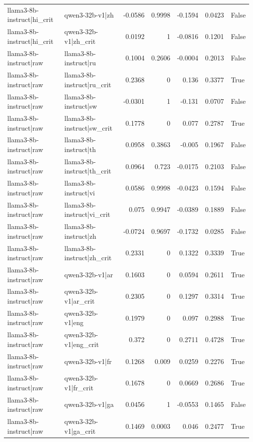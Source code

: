 \begin{table}
\begin{tabular}{l l r r r r l}
llama3-8b-instruct|hi_crit & qwen3-32b-v1|zh & -0.0586 & 0.9998 & -0.1594 & 0.0423 & False \\
llama3-8b-instruct|hi_crit & qwen3-32b-v1|zh_crit & 0.0192 & 1 & -0.0816 & 0.1201 & False \\
llama3-8b-instruct|raw & llama3-8b-instruct|ru & 0.1004 & 0.2606 & -0.0004 & 0.2013 & False \\
llama3-8b-instruct|raw & llama3-8b-instruct|ru_crit & 0.2368 & 0 & 0.136 & 0.3377 & True \\
llama3-8b-instruct|raw & llama3-8b-instruct|sw & -0.0301 & 1 & -0.131 & 0.0707 & False \\
llama3-8b-instruct|raw & llama3-8b-instruct|sw_crit & 0.1778 & 0 & 0.077 & 0.2787 & True \\
llama3-8b-instruct|raw & llama3-8b-instruct|th & 0.0958 & 0.3863 & -0.005 & 0.1967 & False \\
llama3-8b-instruct|raw & llama3-8b-instruct|th_crit & 0.0964 & 0.723 & -0.0175 & 0.2103 & False \\
llama3-8b-instruct|raw & llama3-8b-instruct|vi & 0.0586 & 0.9998 & -0.0423 & 0.1594 & False \\
llama3-8b-instruct|raw & llama3-8b-instruct|vi_crit & 0.075 & 0.9947 & -0.0389 & 0.1889 & False \\
llama3-8b-instruct|raw & llama3-8b-instruct|zh & -0.0724 & 0.9697 & -0.1732 & 0.0285 & False \\
llama3-8b-instruct|raw & llama3-8b-instruct|zh_crit & 0.2331 & 0 & 0.1322 & 0.3339 & True \\
llama3-8b-instruct|raw & qwen3-32b-v1|ar & 0.1603 & 0 & 0.0594 & 0.2611 & True \\
llama3-8b-instruct|raw & qwen3-32b-v1|ar_crit & 0.2305 & 0 & 0.1297 & 0.3314 & True \\
llama3-8b-instruct|raw & qwen3-32b-v1|eng & 0.1979 & 0 & 0.097 & 0.2988 & True \\
llama3-8b-instruct|raw & qwen3-32b-v1|eng_crit & 0.372 & 0 & 0.2711 & 0.4728 & True \\
llama3-8b-instruct|raw & qwen3-32b-v1|fr & 0.1268 & 0.009 & 0.0259 & 0.2276 & True \\
llama3-8b-instruct|raw & qwen3-32b-v1|fr_crit & 0.1678 & 0 & 0.0669 & 0.2686 & True \\
llama3-8b-instruct|raw & qwen3-32b-v1|ga & 0.0456 & 1 & -0.0553 & 0.1465 & False \\
llama3-8b-instruct|raw & qwen3-32b-v1|ga_crit & 0.1469 & 0.0003 & 0.046 & 0.2477 & True \\

\end{tabular}
\end{table}

